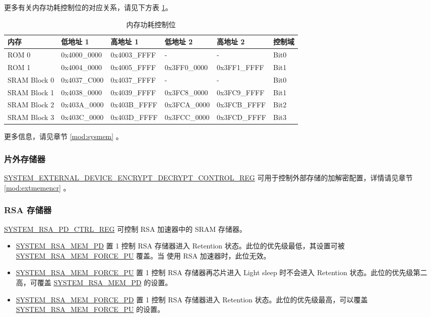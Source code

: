 \documentclass[main\_\_CN.tex]{subfiles}
\begin{document}
更多有关内存功耗控制位的对应关系，请见下方表 \ref{tab:sysreg-mem-controlling-bit}。

\begin{longtable}[c]{| l | l | l |l | l | l |}
\caption{内存功耗控制位}
\label{tab:sysreg-mem-controlling-bit}
\\\hline
\rowcolor{lightgray}
        内存 & 低地址 1 & 高地址 1 & 低地址 2 & 高地址 2 & 控制域 \\ \hline
        ROM 0  & 0x4000\_0000    & 0x4003\_FFFF  &- & -  & Bit0 \\\hline
        ROM 1  & 0x4004\_0000    & 0x4005\_FFFF  & 0x3FF0\_0000  & 0x3FF1\_FFFF & Bit1\\\hline
        SRAM Block 0  & 0x4037\_C000    & 0x4037\_FFFF  & - & -  & Bit0 \\\hline
        SRAM Block 1  & 0x4038\_0000    & 0x4039\_FFFF  & 0x3FC8\_0000  & 0x3FC9\_FFFF & Bit1\\\hline
        SRAM Block 2  & 0x403A\_0000    & 0x403B\_FFFF  & 0x3FCA\_0000  & 0x3FCB\_FFFF & Bit2\\\hline
        SRAM Block 3  & 0x403C\_0000    & 0x403D\_FFFF  & 0x3FCC\_0000  & 0x3FCD\_FFFF & Bit3\\\hline
\end{longtable}

更多信息，请见章节 \ref{mod:sysmem} \textit{}。

\subsubsection{片外存储器}

\hyperref[regdesc:SYSTEMEXTERNALDEVICEENCRYPTDECRYPTCONTROLREG]{SYSTEM\_EXTERNAL\_DEVICE\_ENCRYPT\_DECRYPT\_CONTROL\_REG} 可用于控制外部存储的加解密配置，详情请见章节 \ref{mod:extmemencr}
\textit{}。

\subsubsection{RSA 存储器}

\hyperref[regdesc:SYSTEMRSAPDCTRLREG]{SYSTEM\_RSA\_PD\_CTRL\_REG} 可控制 RSA 加速器中的 SRAM 存储器。

\begin{itemize}
    \item \hyperref[fielddesc:SYSTEMRSAMEMPD]{SYSTEM\_RSA\_MEM\_PD} 置 1 控制 RSA 存储器进入 Retention 状态。此位的优先级最低，其设置可被 \hyperref[fielddesc:SYSTEMRSAMEMFORCEPU]{SYSTEM\_RSA\_MEM\_FORCE\_PU} 覆盖。当 \textit{} 使用 RSA 加速器时，此位无效。
    \item \hyperref[fielddesc:SYSTEMRSAMEMFORCEPU]{SYSTEM\_RSA\_MEM\_FORCE\_PU} 置 1 控制 RSA 存储器再芯片进入 Light sleep 时不会进入 Retention 状态。此位的优先级第二高，可覆盖 \hyperref[fielddesc:SYSTEMRSAMEMPD]{SYSTEM\_RSA\_MEM\_PD} 的设置。
    \item \hyperref[fielddesc:SYSTEMRSAMEMFORCEPD]{SYSTEM\_RSA\_MEM\_FORCE\_PD} 置 1 控制 RSA 存储器进入 Retention 状态。此位的优先级最高，可以覆盖 \hyperref[fielddesc:SYSTEMRSAMEMFORCEPU]{SYSTEM\_RSA\_MEM\_FORCE\_PU} 的设置。
\end{itemize}
\end{document}
